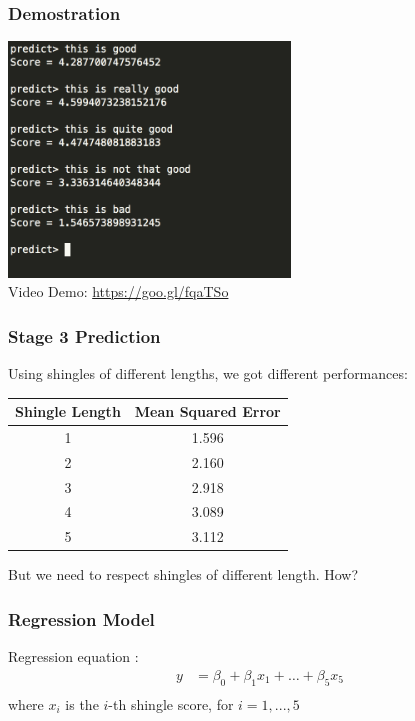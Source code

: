 \documentclass[11pt]{beamer}
\begin{document}
\begin{frame}
\frametitle{Demostration}

	\begin{center}
		\includegraphics[width=7.5cm]{demo} \\
		Video Demo: \url{https://goo.gl/fqaTSo}
	\end{center}

\end{frame}


\begin{frame}
\frametitle{Stage 3 Prediction}

	Using shingles of different lengths, we got different performances:

	\begin{center}
		\begin{tabular}{cc}
			\toprule
				Shingle Length & Mean Squared Error \\
			\midrule
				1 & 1.596 \\
				2 & 2.160 \\
				3 & 2.918 \\
				4 & 3.089 \\
				5 & 3.112 \\
			\bottomrule
		\end{tabular}
	\end{center}
	\vspace{5mm}
	But we need to respect shingles of different length. How?

\end{frame}

\begin{frame}
\frametitle{Regression Model}
\begin{tcolorbox}[colback=blue!5,colframe=blue!40!black,title=Regression model]
Regression equation :
\begin{equation}
\begin{alignedat}{1}
y &= \beta_0  + \beta_1 x_1 + \dots + \beta_5 x_5\\
\end{alignedat}
\end{equation}
where $x_i$ is the $i$-th shingle score, for $i=1,...,5$
\end{tcolorbox}
\end{frame}
\end{document}
